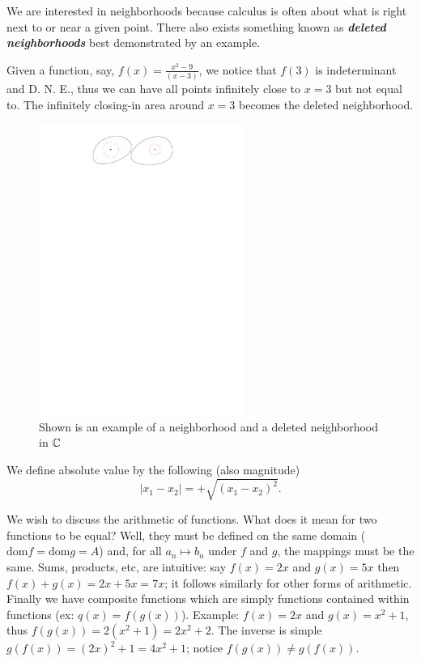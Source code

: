 \documentclass{article}
\begin{document}
We are interested in neighborhoods because calculus is often about what is right next to or near a given point. There also exists something known as \textbf{\textit{deleted neighborhoods}} best demonstrated by an example.

Given a function, say, \( f(x)=\frac{x^2-9}{(x-3)} \), we notice that $f(3)$ is indeterminant and D. N. E., thus we can have all points infinitely close to $x=3$ but not equal to. The infinitely closing-in area around $x=3$ becomes the deleted neighborhood. 


\begin{figure}[ht]
    \centering
 \includegraphics[width=0.6\textwidth]{./figures/nbhd.pdf}
    \caption{Shown is an example of a neighborhood and a deleted neighborhood in $\mathbb{C}$}
    \label{fig:nbhd}
\end{figure}

\begin{definition}
  We define absolute value by the following (also magnitude)\[
    |x_{1}-x_{2}|=+\sqrt{(x_{1}-x_{2})^2} 
  .\] 
\end{definition}

We wish to discuss the arithmetic of functions. What does it mean for two functions to be equal? Well, they must be defined on the same domain ($\text{dom} f = \text{dom} g= A$) and, for all $a_n \mapsto b_n$ under $f$ and $g$, the mappings must be the same. Sums, products, etc, are intuitive: say $f(x) = 2x$ and $g(x)=5x$ then $f(x)+g(x)=2x+5x=7x$; it follows similarly for other forms of arithmetic. Finally we have composite functions which are simply functions contained within functions (ex: $q(x)=f(g(x))$). Example: $f(x)=2x$ and $g(x)=x^2+1$, thus $f(g(x))=2(x^2+1)=2x^2+2$. The inverse is simple $g(f(x))=(2x)^2+1=4x^2+1$; notice $f(g(x))\neq g(f(x))$. 
\end{document}
